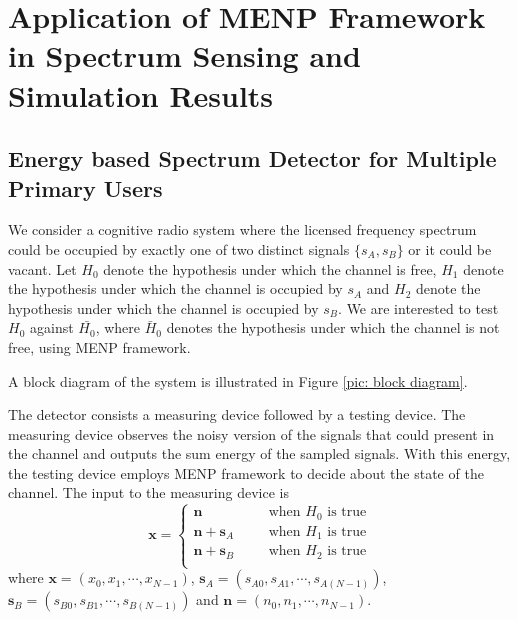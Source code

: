 \section{Application of MENP Framework in Spectrum Sensing and Simulation Results}

\subsection{Energy based Spectrum Detector for Multiple Primary Users}
We consider a cognitive radio system where the licensed frequency spectrum could be occupied by exactly one of two distinct signals $\{s_A, s_B\}$ or it could be vacant. Let $H_0$ denote the hypothesis under which the channel is free, ${H}_1$ denote the hypothesis under which the channel is occupied by $s_A$ and ${H}_2$ denote the hypothesis under which the channel is occupied by $s_B$. We are interested to test $H_0$ against $\bar{{H}_0}$, where $\bar{H}_0$ denotes the hypothesis under which the channel is not free, using MENP framework.

A block diagram of the system is illustrated in Figure \ref{pic: block diagram}.



The detector consists a measuring device followed by a testing device. 
The measuring device observes the noisy version of the signals that could present in the channel and outputs the sum energy of the sampled signals.
With this energy, the testing device employs MENP framework to decide about the state of the channel.
The input to the measuring device is 
\begin{equation}
  \mathbf{x} = \begin{cases}
	\mathbf{n}\;\;\;\;\;\;&\text{when $H_0$ is true}\\
	\mathbf{n}+\mathbf{s}_A\;\;\;\;\;\;&\text{when $H_1$ is true}\\
	\mathbf{n}+\mathbf{s}_B\;\;\;\;\;\;&\text{when $H_2$ is true}\\
  \end{cases}
  \label{equ:1222n0}
\end{equation}
where 
	$\mathbf{x} = (x_0, x_1, \cdots, x_{N-1})$,
	$\mathbf{s}_A = (s_{A0}, s_{A1}, \cdots, s_{A(N-1)})$, 
	$\mathbf{s}_B = (s_{B0}, s_{B1}, \cdots, s_{B(N-1)})$ and 
	$\mathbf{n} = (n_{0}, n_{1}, \cdots, n_{N-1})$. 

